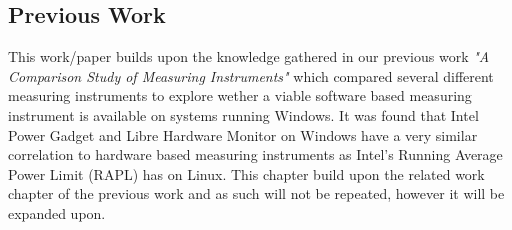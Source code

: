 \subsection{Previous Work}
This work/paper builds upon the knowledge gathered in our previous work \textit{"A Comparison Study of Measuring Instruments"}\cite{biksbois} which compared several different measuring instruments to explore wether a viable software based measuring instrument is available on systems running Windows. It was found that Intel Power Gadget and Libre Hardware Monitor on Windows have a very similar correlation to hardware based measuring instruments as Intel's Running Average Power Limit (RAPL) has on Linux. This chapter build upon the related work chapter of the previous work and as such will not be repeated, however it will be expanded upon.
